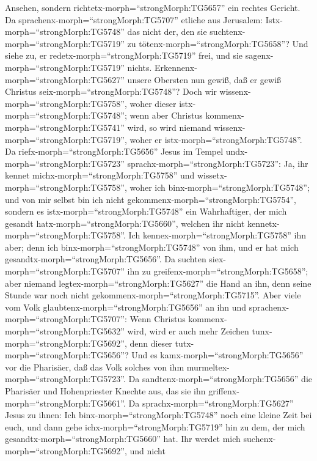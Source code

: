 Ansehen, sondern richtetx-morph=``strongMorph:TG5657'' ein rechtes
Gericht.  Da sprachenx-morph=``strongMorph:TG5707'' etliche
aus Jerusalem: Istx-morph=``strongMorph:TG5748'' das nicht der, den sie
suchtenx-morph=``strongMorph:TG5719'' zu
tötenx-morph=``strongMorph:TG5658''?  Und siehe zu, er
redetx-morph=``strongMorph:TG5719'' frei, und sie
sagenx-morph=``strongMorph:TG5719'' nichts.
Erkennenx-morph=``strongMorph:TG5627'' unsere Obersten nun gewiß, daß er
gewiß Christus seix-morph=``strongMorph:TG5748''?  Doch wir
wissenx-morph=``strongMorph:TG5758'', woher dieser
istx-morph=``strongMorph:TG5748''; wenn aber Christus
kommenx-morph=``strongMorph:TG5741'' wird, so wird niemand
wissenx-morph=``strongMorph:TG5719'', woher er
istx-morph=``strongMorph:TG5748''.  Da
riefx-morph=``strongMorph:TG5656'' Jesus im Tempel
undx-morph=``strongMorph:TG5723'' sprachx-morph=``strongMorph:TG5723'':
Ja, ihr kennet michx-morph=``strongMorph:TG5758'' und
wissetx-morph=``strongMorph:TG5758'', woher ich
binx-morph=``strongMorph:TG5748''; und von mir selbst bin ich nicht
gekommenx-morph=``strongMorph:TG5754'', sondern es
istx-morph=``strongMorph:TG5748'' ein Wahrhaftiger, der mich gesandt
hatx-morph=``strongMorph:TG5660'', welchen ihr nicht
kennetx-morph=``strongMorph:TG5758''.  Ich
kennex-morph=``strongMorph:TG5758'' ihn aber; denn ich
binx-morph=``strongMorph:TG5748'' von ihm, und er hat mich
gesandtx-morph=``strongMorph:TG5656''.  Da suchten
siex-morph=``strongMorph:TG5707'' ihn zu
greifenx-morph=``strongMorph:TG5658''; aber niemand
legtex-morph=``strongMorph:TG5627'' die Hand an ihn, denn seine Stunde
war noch nicht gekommenx-morph=``strongMorph:TG5715''. 
Aber viele vom Volk glaubtenx-morph=``strongMorph:TG5656'' an ihn und
sprachenx-morph=``strongMorph:TG5707'': Wenn Christus
kommenx-morph=``strongMorph:TG5632'' wird, wird er auch mehr Zeichen
tunx-morph=``strongMorph:TG5692'', denn dieser
tutx-morph=``strongMorph:TG5656''?  Und es
kamx-morph=``strongMorph:TG5656'' vor die Pharisäer, daß das Volk
solches von ihm murmeltex-morph=``strongMorph:TG5723''. Da
sandtenx-morph=``strongMorph:TG5656'' die Pharisäer und Hohenpriester
Knechte aus, das sie ihn griffenx-morph=``strongMorph:TG5661''.
 Da sprachx-morph=``strongMorph:TG5627'' Jesus zu ihnen:
Ich binx-morph=``strongMorph:TG5748'' noch eine kleine Zeit bei euch,
und dann gehe ichx-morph=``strongMorph:TG5719'' hin zu dem, der mich
gesandtx-morph=``strongMorph:TG5660'' hat.  Ihr werdet mich
suchenx-morph=``strongMorph:TG5692'', und nicht
